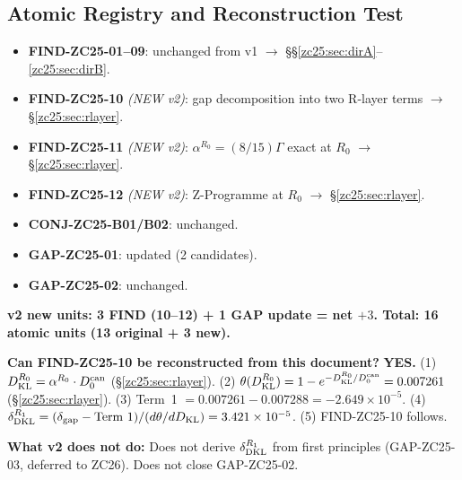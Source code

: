 \documentclass[12pt, a4paper]{article}
\begin{document}
\subsection{Atomic Registry and Reconstruction Test}
\label{zc25:sec:registry}

\begin{formalbox}[title={Atomic Units (v2 total: 16)}]
\begin{itemize}[leftmargin=*,noitemsep]
  \item \textbf{FIND-ZC25-01--09}: unchanged from v1
    $\to$ \S\S\ref{zc25:sec:dirA}--\ref{zc25:sec:dirB}.
  \item \textbf{FIND-ZC25-10} \emph{(NEW v2)}: gap decomposition
    into two R-layer terms $\to$ \S\ref{zc25:sec:rlayer}.
  \item \textbf{FIND-ZC25-11} \emph{(NEW v2)}:
    $\alpha^{R_0}=(8/15)\Gamma$ exact at $R_0$
    $\to$ \S\ref{zc25:sec:rlayer}.
  \item \textbf{FIND-ZC25-12} \emph{(NEW v2)}: Z-Programme at $R_0$
    $\to$ \S\ref{zc25:sec:rlayer}.
  \item \textbf{CONJ-ZC25-B01/B02}: unchanged.
  \item \textbf{GAP-ZC25-01}: updated (2 candidates).
  \item \textbf{GAP-ZC25-02}: unchanged.
\end{itemize}
\textbf{v2 new units: 3 FIND (10--12) + 1 GAP update = net $+3$.
Total: 16 atomic units (13 original + 3 new).}
\end{formalbox}

\begin{formalbox}[title={Reconstruction Test (CUIP No-Loss, v2)}]
\textbf{Can FIND-ZC25-10 be reconstructed from this document?}
\textbf{YES.}
(1) $D_{\rm KL}^{R_0} = \alpha^{R_0}\cdot D_0^{\rm can}$
(\S\ref{zc25:sec:rlayer}).
(2) $\theta(D_{\rm KL}^{R_0}) = 1-e^{-D_{\rm KL}^{R_0}/D_0^{\rm can}}
= 0.007261$ (\S\ref{zc25:sec:rlayer}).
(3) Term~1 $= 0.007261 - 0.007288 = -2.649\times10^{-5}$.
(4) $\delta_{\rm DKL}^{R_1} = (\delta_{\rm gap} - \text{Term~1})
/ (d\theta/dD_{\rm KL}) = 3.421\times10^{-5}$.
(5) FIND-ZC25-10 follows.

\textbf{What v2 does not do:}
Does not derive $\delta_{\rm DKL}^{R_1}$ from first principles
(GAP-ZC25-03, deferred to ZC26).
Does not close GAP-ZC25-02.
\end{formalbox}

\end{document}
